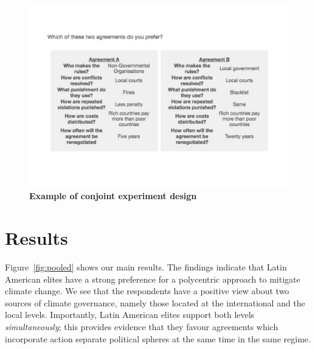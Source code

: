 \documentclass[a4paper,12pt]{article}
\begin{document}
\begin{figure}[H]
	\centering
	\includegraphics[width=13cm]{conjoint-cropped.pdf}
	\caption{\textbf{Example of conjoint experiment design}}
	\label{fig:conjoint}
\end{figure}


\section{Results}%
\label{sec:results}

Figure~\ref{fig:pooled} shows our main results. The findings indicate that Latin American elites have a strong preference for a polycentric approach to mitigate climate change. We see that the respondents have a positive view about two sources of climate governance, namely those located at the international and the local levels. Importantly, Latin American elites support both levels \textit{simultaneously}; this provides evidence that they favour agreements which incorporate action separate political spheres at the same time in the same regime. 
\end{document}
